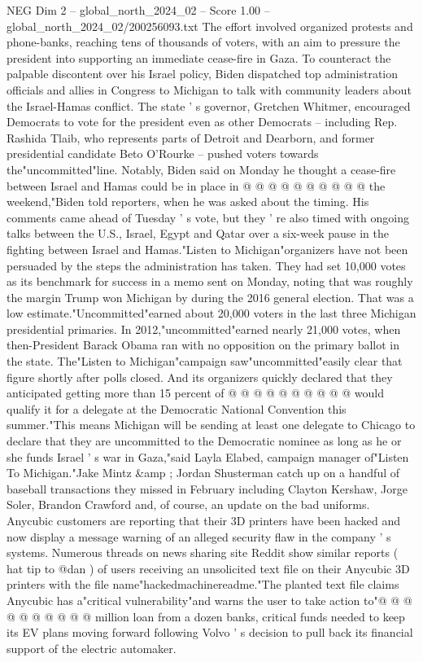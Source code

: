 \begin{textsample}{NEG Dim 2 – global\_north\_2024\_02 – Score 1.00 – global\_north\_2024\_02/200256093.txt}
The effort involved organized protests and phone-banks, reaching tens of thousands of voters, with an aim to pressure the president into supporting an immediate cease-fire in Gaza.
To counteract the palpable discontent over his Israel policy, Biden dispatched top administration officials and allies in Congress to Michigan to talk with community leaders about the Israel-Hamas conflict.
The state ' s governor, Gretchen Whitmer, encouraged Democrats to vote for the president even as other Democrats -- including Rep.
Rashida Tlaib, who represents parts of Detroit and Dearborn, and former presidential candidate Beto O'Rourke -- pushed voters towards the"uncommitted"line.
Notably, Biden said on Monday he thought a cease-fire between Israel and Hamas could be in place in @ @ @ @ @ @ @ @ @ @ the weekend,"Biden told reporters, when he was asked about the timing.
His comments came ahead of Tuesday ' s vote, but they ' re also timed with ongoing talks between the U.S., Israel, Egypt and Qatar over a six-week pause in the fighting between Israel and Hamas."Listen to Michigan"organizers have not been persuaded by the steps the administration has taken.
They had set 10,000 votes as its benchmark for success in a memo sent on Monday, noting that was roughly the margin Trump won Michigan by during the 2016 general election.
That was a low estimate."Uncommitted"earned about 20,000 voters in the last three Michigan presidential primaries.
In 2012,"uncommitted"earned nearly 21,000 votes, when then-President Barack Obama ran with no opposition on the primary ballot in the state.
The"Listen to Michigan"campaign saw"uncommitted"easily clear that figure shortly after polls closed.
And its organizers quickly declared that they anticipated getting more than 15 percent of @ @ @ @ @ @ @ @ @ @ would qualify it for a delegate at the Democratic National Convention this summer."This means Michigan will be sending at least one delegate to Chicago to declare that they are uncommitted to the Democratic nominee as long as he or she funds Israel ' s war in Gaza,"said Layla Elabed, campaign manager of"Listen To Michigan."Jake Mintz \&amp ; Jordan Shusterman catch up on a handful of baseball transactions they missed in February including Clayton Kershaw, Jorge Soler, Brandon Crawford and, of course, an update on the bad uniforms.
Anycubic customers are reporting that their 3D printers have been hacked and now display a message warning of an alleged security flaw in the company ' s systems.
Numerous threads on news sharing site Reddit show similar reports ( hat tip to @dan ) of users receiving an unsolicited text file on their Anycubic 3D printers with the file name"hackedmachinereadme."The planted text file claims Anycubic has a"critical vulnerability"and warns the user to take action to"@ @ @ @ @ @ @ @ @ @ million loan from a dozen banks, critical funds needed to keep its EV plans moving forward following Volvo ' s decision to pull back its financial support of the electric automaker.

\end{textsample}
